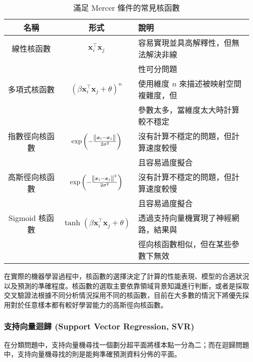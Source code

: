 \begin{table}[htp]
  \centering
  \caption[滿足 Mercer 條件的常見核函數]{滿足 Mercer 條件的常見核函數}
  \begin{tabular*}{\textwidth}{ccl}
    \toprule
    \textbf{名稱}   & \textbf{形式}            & \textbf{說明}          \\
    \midrule
    線性核函數      & $\boldsymbol{x}_{i}^{\top} \boldsymbol{x}_{j}$ & 容易實現並具高解釋性，但無法解決非線 \\
    &   & 性可分問題            \\
    多項式核函數    & $\left( \beta \boldsymbol{x}_{i}^{\top} \boldsymbol{x}_{j} + \theta \right)^{n}$ & 使用維度 $n$ 來描述被映射空間複雜度，但 \\
    &   & 參數太多，當維度太大時計算較不穩定 \\
    指數徑向核函數  & $\exp \left(-\frac{\norm{\boldsymbol{x}_{i} - \boldsymbol{x}_{j}}}{2\sigma^2} \right)$ & 沒有計算不穩定的問題，但計算速度較慢 \\
    &   & 且容易過度擬合 \\
    高斯徑向核函數  & $\exp \left(-\frac{\norm{\boldsymbol{x}_{i} - \boldsymbol{x}_{j}}^2}{2\sigma^2} \right)$ & 沒有計算不穩定的問題，但計算速度較慢 \\
    &   & 且容易過度擬合 \\
    Sigmoid 核函數  & $\tanh{\left( \beta \boldsymbol{x}_{i}^{\top} \boldsymbol{x}_{j} + \theta \right)}$ & 透過支持向量機實現了神經網路，結果與 \\
    &   & 徑向核函數相似，但在某些參數下無效 \\
    \bottomrule
  \end{tabular*}
  \label{table: Kernel Functions}
\end{table}

\noindent 在實際的機器學習過程中，核函數的選擇決定了計算的性能表現、模型的合適狀況以及預測的準確程度。核函數的選取主要依靠領域背景知識進行判斷，或者是採取交叉驗證法根據不同分析情況採用不同的核函數，目前在大多數的情況下將優先採用對於任意樣本都有較好學習能力的高斯徑向核函數。

\subsubsection{支持向量迴歸 (Support Vector Regression, SVR)}

在分類問題中，支持向量機尋找一個劃分超平面將樣本點一分為二；而在迴歸問題中，支持向量機尋找的則是能夠準確預測資料分佈的平面。

